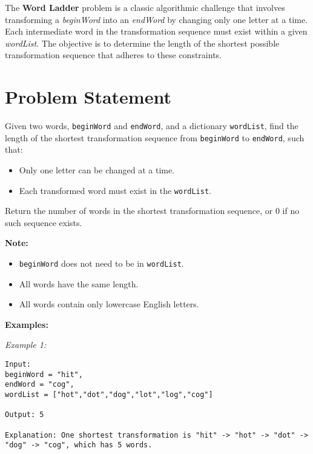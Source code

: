 
\label{problem:word_ladder}

The \textbf{Word Ladder} problem is a classic algorithmic challenge that involves transforming a \textit{beginWord} into an \textit{endWord} by changing only one letter at a time. Each intermediate word in the transformation sequence must exist within a given \textit{wordList}. The objective is to determine the length of the shortest possible transformation sequence that adheres to these constraints.

\section*{Problem Statement}

Given two words, \texttt{beginWord} and \texttt{endWord}, and a dictionary \texttt{wordList}, find the length of the shortest transformation sequence from \texttt{beginWord} to \texttt{endWord}, such that:

\begin{itemize}
    \item Only one letter can be changed at a time.
    \item Each transformed word must exist in the \texttt{wordList}.
\end{itemize}

Return the number of words in the shortest transformation sequence, or \(0\) if no such sequence exists.

\textbf{Note:}
\begin{itemize}
    \item \texttt{beginWord} does not need to be in \texttt{wordList}.
    \item All words have the same length.
    \item All words contain only lowercase English letters.
\end{itemize}

\textbf{Examples:}

\textit{Example 1:}

\begin{verbatim}
Input:
beginWord = "hit",
endWord = "cog",
wordList = ["hot","dot","dog","lot","log","cog"]

Output: 5

Explanation: One shortest transformation is "hit" -> "hot" -> "dot" -> "dog" -> "cog", which has 5 words.
\end{verbatim}

